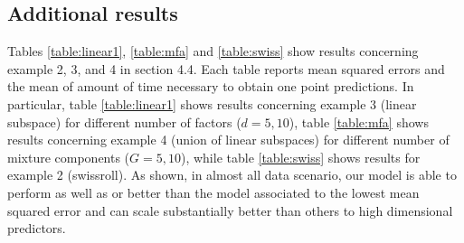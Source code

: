\documentclass{article} %
\begin{document}
\subsection{Additional results}
Tables \ref{table:linear1}, \ref{table:mfa} and \ref{table:swiss} show results concerning example 2, 3, and 4 in section 4.4. Each table reports mean squared errors and the mean of amount of time necessary to obtain one point predictions. In particular, table \ref{table:linear1} shows results concerning example 3 (linear subspace) for different number of factors ($d=5,10$), table \ref{table:mfa} shows results concerning example 4 (union of linear subspaces) for different number of mixture components ($G=5, 10$), while table \ref{table:swiss} shows results for example 2 (swissroll). As shown, in almost all data scenario, our model is able to perform as well as or better than the model associated to the lowest mean squared error and can scale substantially better than others to high dimensional predictors. 
\end{document}
